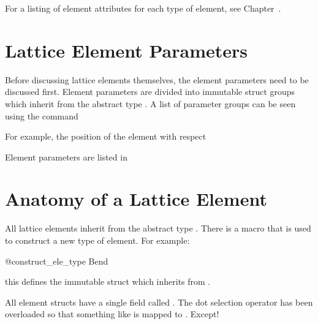For a listing of element attributes for each type of element, see Chapter~.

\newpage

\section{Lattice Element Parameters}

Before discussing lattice elements themselves, the element parameters need to be discussed first.
Element parameters are divided into immutable struct groups which inherit from the abstract type
. A list of parameter groups can be seen using the command

For example, the position of the element with respect

Element parameters are listed in 

\section{Anatomy of a Lattice Element}

All lattice elements inherit from the abstract type . There is a macro 
that is used to construct a new type of element. For example:
\begin{example}
  @construct_ele_type Bend
\end{example}
this defines the immutable  struct which inherits from . 

All element structs have a single  field called .
The dot selection operator has been overloaded so that something like 
is mapped to . Except!


